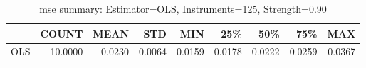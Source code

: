 \begin{table}[ht]
\centering
\caption{mse summary: Estimator=OLS, Instruments=125, Strength=0.90}
\begin{tabular}{lrrrrrrrr}
\toprule
 & COUNT & MEAN & STD & MIN & 25\% & 50\% & 75\% & MAX \\
\midrule
OLS & 10.0000 & 0.0230 & 0.0064 & 0.0159 & 0.0178 & 0.0222 & 0.0259 & 0.0367 \\
\bottomrule
\end{tabular}
\end{table}
